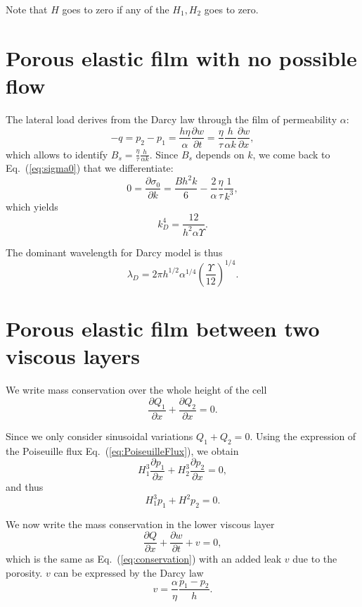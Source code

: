 \documentclass[12pt,a4paper]{revtex4}
\begin{document}
Note that $H$ goes to zero if any of the $H_1,H_2$ goes to zero.

\section{Porous elastic film with no possible flow}
The lateral load derives from the Darcy law through the film of permeability $\alpha$:
\begin{equation}
-q = p_2-p_1 = \frac{h\eta}{\alpha}\frac{\partial w}{\partial t} = \frac{\eta}{\tau}\frac{h}{\alpha k} \frac{\partial w}{\partial x},
\end{equation}
which allows to identify $B_s = \frac{\eta}{\tau}\frac{h}{\alpha k}$. Since $B_s$ depends on $k$, we come back to Eq.~(\ref{eq:sigma0}) that we differentiate:
\begin{equation}
0 = \frac{\partial\sigma_0}{\partial k}
 = \frac{Bh^2 k}{6} - \frac{2}{\alpha}\frac{\eta}{\tau}\frac{1}{k^3},
\end{equation}
which yields 
\begin{equation}
k_D^4 = \frac{12}{h^2\alpha\Upsilon}.
\end{equation}

The dominant wavelength for Darcy model is thus
\begin{equation}
\lambda_D = 2\pi h^{1/2}\alpha^{1/4}\left(\frac{\Upsilon}{12}\right)^{1/4}.
\end{equation}

\section{Porous elastic film between two viscous layers}
We write mass conservation over the whole height of the cell
\begin{equation}
\frac{\partial Q_1}{\partial x} + \frac{\partial Q_2}{\partial x} = 0.
\end{equation}

Since we only consider sinusoidal variations $Q_1 + Q_2 = 0$. Using the expression of the Poiseuille flux Eq.~(\ref{eq:PoiseuilleFlux}), we obtain
\begin{equation}
H_1^3 \frac{\partial p_1}{\partial x} + H_2^3 \frac{\partial p_2}{\partial x} = 0,
\end{equation}
and thus
\begin{equation}
H_1^3 p_1 + H^2 p_2 = 0.
\label{eq:pressures}
\end{equation}

We now write the mass conservation in the lower viscous layer
\begin{equation}
\frac{\partial Q}{\partial x} + \frac{\partial w}{\partial t} + v = 0,
\label{eq:conservationDarcy}
\end{equation}
which is the same as Eq.~(\ref{eq:conservation}) with an added leak $v$ due to the porosity. $v$ can be expressed by the Darcy law
\begin{equation}
v = \frac{\alpha}{\eta} \frac{p_1-p_2}{h}.
\label{eq:Darcy}
\end{equation}
\end{document}
